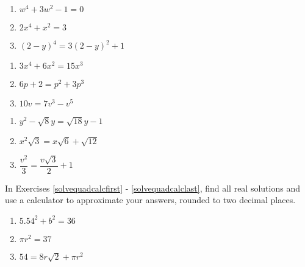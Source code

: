 \documentclass{ximera}
\begin{document}
\begin{multicols}{3}
\begin{enumerate}
\setcounter{enumi}{\value{HW}}

\item $w^4 + 3w^2 - 1 = 0$
\item $2x^4 +x^2 = 3$ 
\item $(2-y)^4 = 3(2-y)^2 + 1$

\setcounter{HW}{\value{enumi}}
\end{enumerate}
\end{multicols}

\begin{multicols}{3}
\begin{enumerate}
\setcounter{enumi}{\value{HW}}

\item $3x^4 + 6x^2 = 15x^3$
\item $6p + 2 = p^2 + 3p^3$
\item $10v = 7v^3 - v^5$

\setcounter{HW}{\value{enumi}}
\end{enumerate}
\end{multicols}



\begin{multicols}{3}
\begin{enumerate}
\setcounter{enumi}{\value{HW}}

\item $y^2 - \sqrt{8} y = \sqrt{18} y - 1$
\item $x^2 \sqrt{3} = x \sqrt{6} + \sqrt{12}$
\item $\dfrac{v^2}{3} = \dfrac{v \sqrt{3}}{2} + 1$ \label{solvequadlast}

\setcounter{HW}{\value{enumi}}
\end{enumerate}
\end{multicols}

In Exercises \ref{solvequadcalcfirst} - \ref{solvequadcalclast}, find all real solutions and use a calculator to approximate your answers, rounded to two decimal places.

\begin{multicols}{3}
\begin{enumerate}
\setcounter{enumi}{\value{HW}}

\item $5.54^2 + b^2 = 36$\label{solvequadcalcfirst}
\item $\pi r^2 = 37$ 
\item $54 = 8r\sqrt{2} + \pi r^2$


\setcounter{HW}{\value{enumi}}
\end{enumerate}
\end{multicols}
\end{document}
